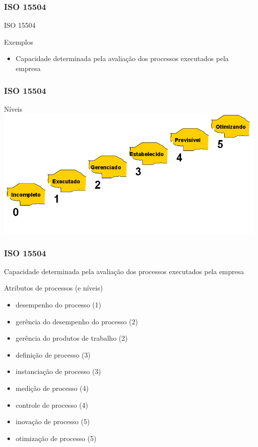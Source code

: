 \begin{frame}[parent={ie:agenda}, hasnext=true, hasprev=false]
	\frametitle{ISO 15504}

	
	\begin{block:concept}{ISO 15504}
	\end{block:concept}
	
	\begin{block:fact}{Exemplos}
		\begin{itemize}
			\item Capacidade determinada pela avaliação dos processos executados pela
			empresa
		\end{itemize}
	\end{block:fact}
\end{frame}


\begin{frame}[hasnext=true, hasprev=true]
	\frametitle{ISO 15504}

	\begin{block:fact}{Níveis}
		\centering
		\includegraphics[width=\textwidth]{software-engineering/project-management/process/process-quality/iso15504/iso15504-steps}
	\end{block:fact}
\end{frame}

\begin{frame}
	\frametitle{ISO 15504}

	\begin{block:fact}{}
		Capacidade determinada pela avaliação dos processos executados pela empresa
	\end{block:fact}
	
	\begin{block:fact}{Atributos de processos (e níveis)}
		\begin{itemize}
			\item desempenho do processo (1)
			\item gerência do desempenho do processo (2)
			\item gerência do produtos de trabalho (2)
			\item definição de processo (3)
			\item instanciação de processo (3)
			\item medição de processo (4)
			\item controle de processo (4)
			\item inovação de processo (5)
			\item otimização de processo (5)
		\end{itemize}
	\end{block:fact}
\end{frame}

